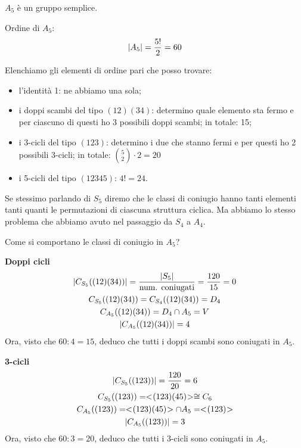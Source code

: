 \begin{teorema}
	$A_5$ è un gruppo semplice.
\end{teorema}

\begin{dimostrazione}
	Ordine di $A_5$:
	\begin{equation*}
		\lvert A_5 \rvert = \dfrac{5!}{2} = 60
	\end{equation*}

	Elenchiamo gli elementi di ordine pari che posso trovare:
	\begin{itemize}
		\item l'identità 1: ne abbiamo una sola;
		\item i doppi scambi del tipo $(12)(34)$: determino quale elemento sta fermo e per ciascuno di questi ho 3
		possibili doppi scambi;
		in totale: 15;
		\item i 3-cicli del tipo $(123)$: determino i due che stanno fermi e per questi ho 2 possibili 3-cicli;
		in totale: $\binom{5}{2} \cdot 2 = 20$
		\item i 5-cicli del tipo $(12345)$: $4! = 24$.
	\end{itemize}

	Se stessimo parlando di $S_5$ diremo che le classi di coniugio hanno tanti elementi tanti quanti le permutazioni
	di ciascuna struttura ciclica.
	Ma abbiamo lo stesso problema che abbiamo avuto nel passaggio da $S_4$ a $A_4$.

	Come si comportano le classi di coniugio in $A_5$?

	\textbf{Doppi cicli}
	\begin{gather*}
		\lvert C_{S_5}((12)(34)) \rvert = \dfrac{\lvert S_5 \rvert}{\text{num. coniugati}} = \dfrac{120}{15} = 0 \\
		C_{S_5}((12)(34)) = C_{S_4}((12)(34)) = D_4 \\
		C_{A_5}((12)(34)) = D_4 \cap A_5 = V \\
		\lvert C_{A_5}((12)(34)) \rvert = 4
	\end{gather*}
	Ora, visto che $60 : 4 = 15$, deduco che tutti i doppi scambi sono coniugati in $A_5$.

	\textbf{3-cicli}
	\begin{gather*}
		\lvert C_{S_5}((123)) \rvert = \dfrac{120}{20} = 6 \\
		C_{S_5}((123)) = < \negmedspace (123)(45) \negmedspace > \cong C_6 \\
		C_{A_5}((123)) = < \negmedspace (123)(45) \negmedspace > \cap A_5 = < \negmedspace (123) \negmedspace > \\
		\lvert C_{A_5}((123)) \rvert = 3
	\end{gather*}
	Ora, visto che $60 : 3 = 20$, deduco che tutti i 3-cicli sono coniugati in $A_5$.


\end{dimostrazione}
